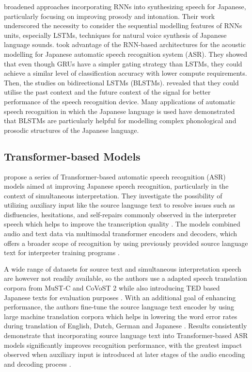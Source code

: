 \textcite{Kubo2014DeepLearning} broadened approaches incorporating RNNs into synthesizing speech for Japanese, particularly focusing on improving prosody and intonation. Their work underscored the necessity to consider the sequential modelling features of RNNs units, especially LSTMs, techniques for natural voice synthesis of Japanese language sounds. \textcite{takeuchi2020real} took advantage of the RNN-based architectures for the acoustic modelling for Japanese automatic speech recognition system (ASR). They showed that even though GRUs have a simpler gating strategy than LSTMs, they could achieve a similar level of classification accuracy with lower compute requirements. Then, the studies on bidirectional LSTMs (BLSTMs). \textcite{imaizumi2022} revealed that they could utilise the past context and the future context of the signal for better performance of the speech recognition device. Many applications of automatic speech recognition in which the Japanese language is used have demonstrated that BLSTMs are particularly helpful for modelling complex phonological and prosodic structures of the Japanese language.


\subsection{Transformer-based Models}
\textcite{taniguchi2022transformer} propose a series of Transformer-based automatic speech recognition (ASR) models aimed at improving Japanese speech recognition, particularly in the context of simultaneous interpretation. They investigate the possibility of utilizing auxiliary input like the source language text to resolve issues such as disfluencies, hesitations, and self-repairs commonly observed in the interpreter speech which helps to improve the transcription quality \parencite{Futami2020Bidirectional}. The models combined audio and text data via multimodal transformer encoders and decoders, which offers a broader scope of recognition by using previously provided source language text for interpreter training programs \parencite{taniguchi2022transformer}.

A wide range of datasets for source text and simultaneous interpretation speech are however not readily available, so the authors use a adapted speech translation corpora from MuST-C and CoVoST 2 while also introducing TED based Japanese texts for evaluation purposes \parencite{taniguchi2022transformer}. With an additional goal of enhancing performance, the authors fine-tune the source language text encoder by using large machine translation corpora which helps in lowering the word error rates during translation of English, Dutch, German and Japanese  \parencite{Taniguchi2024Pretraining}. Results consistently demonstrate that incorporating source language text into Transformer-based ASR models significantly improves recognition performance, with the greatest impact observed when auxiliary input is introduced at later stages of the audio encoding and decoding process \parencite{Futami2020Bidirectional}.

